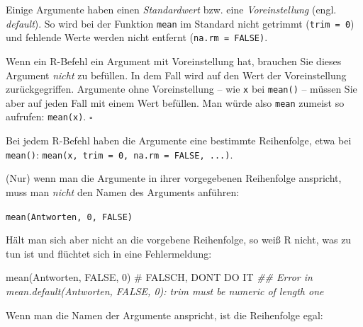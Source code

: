 \documentclass[
  a4paper,
  DIV=11]{scrreprt}
\newenvironment{Shaded}{\begin{snugshade}}{\end{snugshade}}
\newcommand{\CommentTok}[1]{\textcolor[rgb]{0.37,0.37,0.37}{#1}}
\newcommand{\ConstantTok}[1]{\textcolor[rgb]{0.56,0.35,0.01}{#1}}
\newcommand{\DecValTok}[1]{\textcolor[rgb]{0.68,0.00,0.00}{#1}}
\newcommand{\DocumentationTok}[1]{\textcolor[rgb]{0.37,0.37,0.37}{\textit{#1}}}
\newcommand{\FunctionTok}[1]{\textcolor[rgb]{0.28,0.35,0.67}{#1}}
\newcommand{\NormalTok}[1]{\textcolor[rgb]{0.00,0.23,0.31}{#1}}
\theoremstyle{definition}
\theoremstyle{definition}
\theoremstyle{definition}
\theoremstyle{remark}
\begin{document}
Einige Argumente haben einen \emph{Standardwert} bzw. eine
\emph{Voreinstellung} (engl. \emph{default}). So wird bei der Funktion
\texttt{mean} im Standard nicht getrimmt (\texttt{trim\ =\ 0}) und
fehlende Werte werden nicht entfernt (\texttt{na.rm\ =\ FALSE)}.

\begin{tcolorbox}[enhanced jigsaw, leftrule=.75mm, opacitybacktitle=0.6, colback=white, colframe=quarto-callout-note-color-frame, coltitle=black, colbacktitle=quarto-callout-note-color!10!white, opacityback=0, left=2mm, breakable, titlerule=0mm, toptitle=1mm, bottomtitle=1mm, rightrule=.15mm, title=\textcolor{quarto-callout-note-color}{\faInfo}\hspace{0.5em}{Hinweis}, arc=.35mm, bottomrule=.15mm, toprule=.15mm]

Wenn ein R-Befehl ein Argument mit Voreinstellung hat, brauchen Sie
dieses Argument \emph{nicht} zu befüllen. In dem Fall wird auf den Wert
der Voreinstellung zurückgegriffen. Argumente ohne Voreinstellung -- wie
\texttt{x} bei \texttt{mean()} -- müssen Sie aber auf jeden Fall mit
einem Wert befüllen. Man würde also \texttt{mean} zumeist so aufrufen:
\texttt{mean(x)}. \(\square\)

\end{tcolorbox}

Bei jedem R-Befehl haben die Argumente eine bestimmte Reihenfolge, etwa
bei \texttt{mean()}:
\texttt{mean(x,\ trim\ =\ 0,\ na.rm\ =\ FALSE,\ ...)}.

(Nur) wenn man die Argumente in ihrer vorgegebenen Reihenfolge
anspricht, muss man \emph{nicht} den Namen des Arguments anführen:

 \texttt{mean(Antworten,\ 0,\ FALSE)}

Hält man sich aber nicht an die vorgebene Reihenfolge, so weiß R nicht,
was zu tun ist und flüchtet sich in eine Fehlermeldung:

\begin{Shaded}
\begin{Highlighting}[]
\FunctionTok{mean}\NormalTok{(Antworten, }\ConstantTok{FALSE}\NormalTok{, }\DecValTok{0}\NormalTok{)  }\CommentTok{\# FALSCH, DON\textquotesingle{}T DO IT }
\DocumentationTok{\#\# Error in mean.default(Antworten, FALSE, 0): \textquotesingle{}trim\textquotesingle{} must be numeric of length one}
\end{Highlighting}
\end{Shaded}

Wenn man die Namen der Argumente anspricht, ist die Reihenfolge egal:
\end{document}
